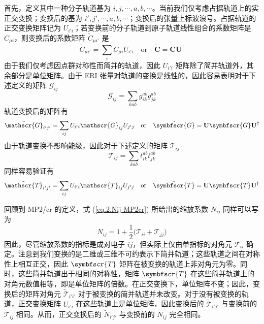 首先，定义其中一种分子轨道基为 $i, j, \cdots, a, b, \cdots$。当前我们仅考虑占据轨道上的实正交变换；变换后的基为 $i', j', \cdots, a, b, \cdots$；变换后的张量上标波浪号。占据轨道的正交变换矩阵记为 $U_{i' i}$；若变换前的分子轨道到原子轨道线性组合的系数矩阵是 $C_{\mu i}$，则变换后的系数矩阵 $\tilde{C}_{\mu i'}$ 是
\begin{equation*}
  \tilde{C}_{\mu i'} = \sum_{i} C_{\mu i} U_{i' i}
  \quad \text{or} \quad
  \tilde{\mathbf{C}} = \mathbf{C} \mathbf{U}^\dagger
\end{equation*}
由于我们仅考虑因点群对称性而简并的轨道，因此 $U_{i' i}$ 矩阵除了简并轨道外，其余部分是单位矩阵。由于 ERI 张量对轨道的变换是线性的，因此容易表明对于下述定义的矩阵 $\mathscr{G}_{ij}$
\begin{equation*}
  \mathscr{G}_{ij} = \sum_{kab} g_{ik}^{ab} g_{jk}^{ab}
\end{equation*}
轨道变换后的矩阵有
\begin{equation*}
  \tilde{\mathscr{G}}_{i'j'} = \sum_{ij} U_{i' i} \mathscr{G}_{ij} U_{j' j}
  \quad \text{or} \quad
  \tilde{\symbfscr{G}} = \mathbf{U} \symbfscr{G} \mathbf{U}^\dagger
\end{equation*}
由于轨道变换不影响能级，因此对于下述定义的矩阵 $\mathscr{T}_{ij}$
\begin{equation*}
  \mathscr{T}_{ij} = \sum_{kab} t_{ik}^{ab} t_{jk}^{ab}
\end{equation*}
同样容易验证有
\begin{equation*}
  \tilde{\mathscr{T}}_{i'j'} = \sum_{ij} U_{i' i} \mathscr{T}_{ij} U_{j' j}
  \quad \text{or} \quad
  \tilde{\symbfscr{T}} = \mathbf{U} \symbfscr{T} \mathbf{U}^\dagger
\end{equation*}

回顾到 MP2/cr 的定义，式 (\ref{eq.2.Nij-MP2cr}) 所给出的缩放系数 $N_{ij}$ 同样可以写为
\begin{equation*}
  N_{ij} = 1 + \frac{1}{2} \big( \mathscr{T}_{ii} + \mathscr{T}_{jj} \big)
\end{equation*}
因此，尽管缩放系数的指标是成对电子 $ij$，但实际上仅由单指标的对角元 $\mathscr{T}_{ii}$ 确定。注意到我们变换的是二维或三维不可约表示下简并轨道；这些轨道之间在对称性上相互正交，因此 $\symbfscr{T}$ 矩阵在被变换的轨道上非对角元为零。同时，这些简并轨道出于相同的对称性，矩阵 $\symbfscr{T}$ 在这些简并轨道上的对角元数值相等，即是单位矩阵的倍数。在正交变换下，单位矩阵不变；因此，变换后的矩阵对角元 $\tilde{\mathscr{T}}_{i'i'}$ 对于被变换的简并轨道并未改变。对于没有被变换的轨道，正交变换矩阵 $U_{i'i}$ 在这些轨道上是单位矩阵，因此变换后的 $\tilde{\mathscr{T}}_{i' j'}$ 与变换前的 $\mathscr{T}_{ij}$ 相同。从而，正交变换后的 $\tilde{N}_{i'j'}$ 与变换前的 $N_{ij}$ 完全相同。

